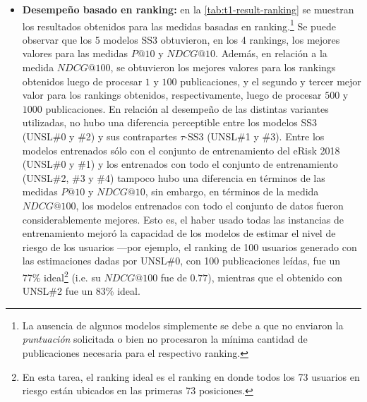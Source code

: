 \begin{itemize}
    \item \textbf{Desempeño basado en ranking:} en la \autoref{tab:t1-result-ranking} se muestran los resultados obtenidos para las medidas basadas en ranking.\footnote{La ausencia de algunos modelos simplemente se debe a que no enviaron la \emph{puntuación} solicitada o bien no procesaron la mínima cantidad de publicaciones necesaria para el respectivo ranking.}
    Se puede observar que los 5 modelos SS3 obtuvieron, en los 4 rankings, los mejores valores para las medidas $P@10$ y $NDCG@10$.
    Además, en relación a la medida $NDCG@100$, se obtuvieron los mejores valores para los rankings obtenidos luego de procesar $1$ y $100$ publicaciones, y el segundo y tercer mejor valor para los rankings obtenidos, respectivamente, luego de procesar $500$ y $1000$ publicaciones.
    En relación al desempeño de las distintas variantes utilizadas, no hubo una diferencia perceptible entre los modelos SS3 (UNSL\#0 y \#2) y sus contrapartes $\tau$-SS3 (UNSL\#1 y \#3).
    Entre los modelos entrenados sólo con el conjunto de entrenamiento del eRisk 2018 (UNSL\#0 y \#1) y los entrenados con todo el conjunto de entrenamiento (UNSL\#2, \#3 y \#4) tampoco hubo una diferencia en términos de las medidas $P@10$ y $NDCG@10$, sin embargo, en términos de la medida $NDCG@100$, los modelos entrenados con todo el conjunto de datos fueron considerablemente mejores.
    Esto es, el haber usado todas las instancias de entrenamiento mejoró la capacidad de los modelos de estimar el nivel de riesgo de los usuarios ---por ejemplo, el ranking de 100 usuarios generado con las estimaciones dadas por UNSL\#0, con 100 publicaciones leídas, fue un 77\% ideal\footnote{En esta tarea, el ranking ideal es el ranking en donde todos los 73 usuarios en riesgo están ubicados en las primeras 73 posiciones.} (i.e. su $NDCG@100$ fue de $0.77$), mientras que el obtenido con UNSL\#2 fue un 83\% ideal.

\end{itemize}
